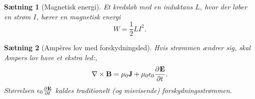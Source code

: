 \documentclass[]{article}
\newtheorem{theorem}{Sætning}
\theoremstyle{definition}
\begin{document}
\begin{theorem}[Magnetisk energi]
	Et kredsløb med en induktans $L$, hvor der løber en strøm $I$, bærer en magnetisk energi
	\begin{equation*}
		W = \dfrac{1}{2} LI^2.
	\end{equation*}
\end{theorem}

\begin{theorem}[Ampères lov med forskydningsled]
	Hvis strømmen ændrer sig, skal Ampers lov have et ekstra led:,
	\begin{equation*}
		\nabla \times \mathbf{B} = \mu_0 \mathbf{J} + \mu_0 \epsilon_0 \frac{\partial^{} \mathbf{E}}{\partial t ^{}}.
	\end{equation*}
	Størrelsen $ \epsilon_0 \frac{\partial^{} \mathbf{E}}{\partial t ^{}}$ kaldes traditionelt (og misvisende) \emph{forskydningsstrømmen}.
\end{theorem}


\newpage
\end{document}
